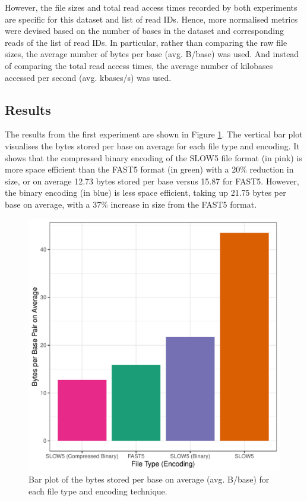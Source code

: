However, the file sizes and total read access times recorded by both experiments are specific for this dataset and list of read IDs. Hence, more normalised metrics were devised based on the number of bases in the dataset and corresponding reads of the list of read IDs. In particular, rather than comparing the raw file sizes, the average number of bytes per base (avg. B/base) was used. And instead of comparing the total read access times, the average number of kilobases accessed per second (avg. kbases/s) was used.

\subsection{Results}
\label{sec:experi:results}

The results from the first experiment are shown in Figure \ref{fig:size}. The vertical bar plot visualises the bytes stored per base on average for each file type and encoding. It shows that the compressed binary encoding of the SLOW5 file format (in pink) is more space efficient than the FAST5 format (in green) with a 20\% reduction in size, or on average 12.73 bytes stored per base versus 15.87 for FAST5. However, the binary encoding (in blue) is less space efficient, taking up 21.75 bytes per base on average, with a 37\% increase in size from the FAST5 format.

\begin{figure}[h]
    \includegraphics[width=\linewidth]{../../plots/gpgpu_size.pdf}
    \caption[Bar plot of the bytes stored per base on average for each file type and encoding technique.]{Bar plot of the bytes stored per base on average (avg. B/base) for each file type and encoding technique.}
    \label{fig:size}
\end{figure}

